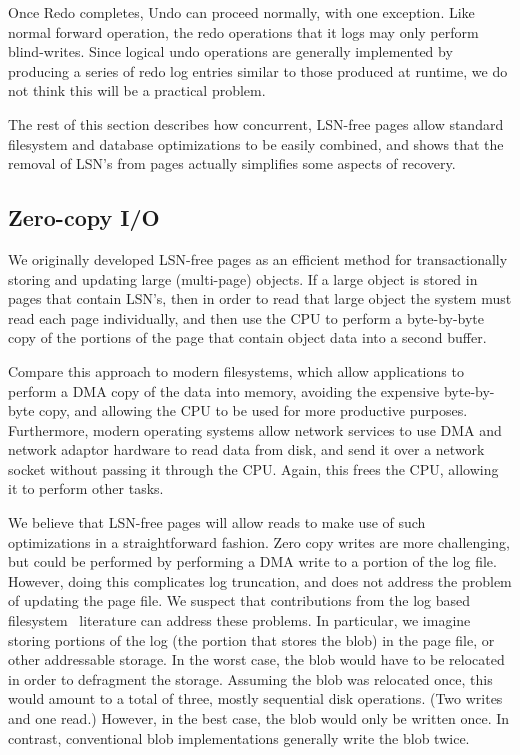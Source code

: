 \documentclass[letterpaper,twocolumn,10pt]{article}
\begin{document}
Once Redo completes, Undo can proceed normally, with one exception.
Like normal forward operation, the redo operations that it logs may
only perform blind-writes.  Since logical undo operations are
generally implemented by producing a series of redo log entries
similar to those produced at runtime, we do not think this will be a
practical problem.

The rest of this section describes how concurrent, LSN-free pages 
allow standard filesystem and database optimizations to be easily
combined, and shows that the removal of LSN's from pages actually
simplifies some aspects of recovery.

\subsection{Zero-copy I/O} 

We originally developed LSN-free pages as an efficient method for
transactionally storing and updating large (multi-page) objects.  If a
large object is stored in pages that contain LSN's, then in order to
read that large object the system must read each page individually,
and then use the CPU to perform a byte-by-byte copy of the portions of
the page that contain object data into a second buffer.

Compare this approach to modern filesystems, which allow applications to
perform a DMA copy of the data into memory, avoiding the expensive
byte-by-byte copy, and allowing the CPU to be used for
more productive purposes.  Furthermore, modern operating systems allow
network services to use DMA and network adaptor hardware to read data
from disk, and send it over a network socket without passing it
through the CPU.  Again, this frees the CPU, allowing it to perform
other tasks.

We believe that LSN-free pages will allow reads to make use of such
optimizations in a straightforward fashion.  Zero copy writes are more challenging, but could be
performed by performing a DMA write to a portion of the log file.
However, doing this complicates log truncation, and does not address
the problem of updating the page file.  We suspect that contributions
from the log based filesystem~\cite{lfs} literature can address these problems.
In particular, we imagine storing 
portions of the log (the portion that stores the blob) in the 
page file, or other addressable storage.  In the worst case, 
the blob would have to be relocated in order to defragment the 
storage.  Assuming the blob was relocated once, this would amount 
to a total of three, mostly sequential disk operations.  (Two 
writes and one read.)  However, in the best case, the blob would only be written once.
In contrast, conventional blob implementations generally write the blob twice. 
\end{document}
